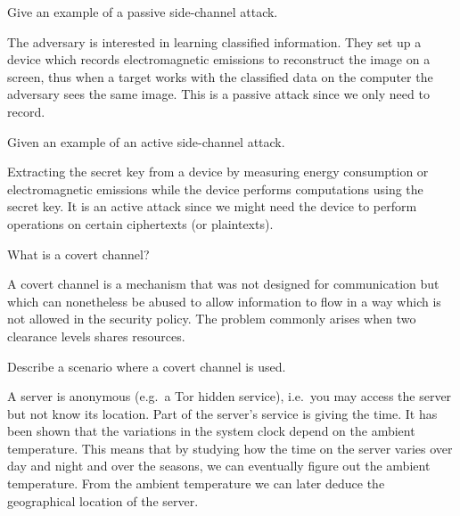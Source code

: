 \question[3]\label{q:sidechannels}
Give an example of a passive side-channel attack.

\begin{solution}
  The adversary is interested in learning classified information.
  They set up a device which records electromagnetic emissions to reconstruct 
  the image on a screen, thus when a target works with the classified data on 
  the computer the adversary sees the same image.
  This is a passive attack since we only need to record.
\end{solution}


\question[3]\label{q:sidechannels}
Given an example of an active side-channel attack.

\begin{solution}
  Extracting the secret key from a device by measuring energy consumption or 
  electromagnetic emissions while the device performs computations using the 
  secret key.
  It is an active attack since we might need the device to perform operations 
  on certain ciphertexts (or plaintexts).
\end{solution}


\question[3]\label{q:sidechannels}
What is a covert channel?

\begin{solution}
  A covert channel is a mechanism that was not designed for communication but 
  which can nonetheless be abused to allow information to flow in a way which 
  is not allowed in the security policy.
  The problem commonly arises when two clearance levels shares resources.
\end{solution}


\question[4]\label{q:sidechannels}
Describe a scenario where a covert channel is used.

\begin{solution}
  A server is anonymous (e.g.\ a Tor hidden service), i.e.\ you may access the 
  server but not know its location.
  Part of the server's service is giving the time.
  It has been shown that the variations in the system clock depend on the 
  ambient temperature.
  This means that by studying how the time on the server varies over day and 
  night and over the seasons, we can eventually figure out the ambient 
  temperature.
  From the ambient temperature we can later deduce the geographical location of 
  the server.
\end{solution}


